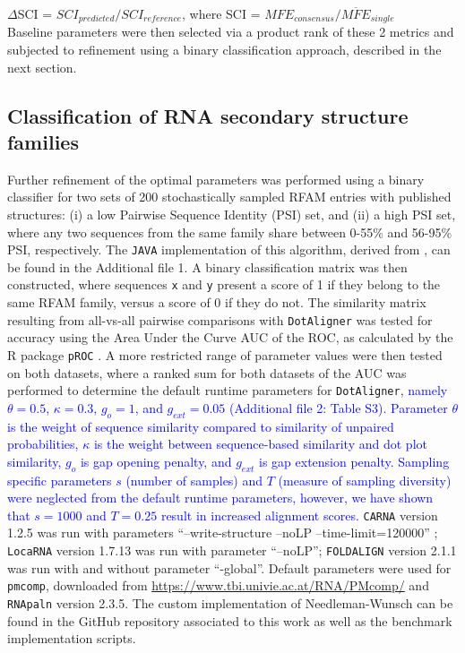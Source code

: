 \documentclass{bmcart}
\newcommand\dotaligner{\texttt{DotAligner}}
\newcommand\locarna{\texttt{LocaRNA}}
\newcommand\foldalign{\texttt{FOLDALIGN}}
\newcommand\carna{\texttt{CARNA}}
\begin{document}
$\Delta$SCI = $SCI_{predicted} / SCI_{reference}$, where SCI = $ MFE_{consensus}  / \overline{MFE}_{single}  $\\

Baseline parameters were then selected via a product rank of these 2 metrics 
and subjected to refinement using a binary classification approach, described in the next section. 

\subsection*{Classification of RNA secondary structure families}
Further refinement of the optimal parameters was performed using a binary classifier for two sets of 
200 stochastically sampled RFAM entries with published structures: 
(i) a low Pairwise Sequence Identity (PSI) set, and (ii) a high PSI set, 
where any two sequences from the same family share between 0-55\% and 56-95\% PSI, respectively. The \texttt{JAVA} implementation of this algorithm, derived from \cite{smith2013widespread}, can be found in the Additional file 1. 
A binary classification matrix was then constructed, where sequences \texttt{x} and \texttt{y}
present a score of 1 if they belong to the same RFAM family, versus a score of 0 if they do not. 
The similarity matrix resulting from all-vs-all pairwise comparisons with \dotaligner{} was tested for 
accuracy using the Area Under the Curve AUC of the ROC, as calculated by the R package \texttt{pROC} \cite{robin2011proc}. 
A more restricted range of parameter values were then tested on both datasets, where a ranked sum for both datasets of the AUC was performed to determine the default runtime parameters for \dotaligner, 
\textcolor{blue}{
namely $\theta=0.5$, $\kappa=0.3$, $g_o=1$, and $g_{ext}=0.05$ (Additional file 2: Table S3). Parameter $\theta$ is the weight of sequence similarity compared to similarity of unpaired probabilities, $\kappa$ is the weight between sequence-based similarity and dot plot similarity, $g_o$ is gap opening penalty, and $g_{ext}$ is gap extension penalty.
Sampling specific parameters $s$ (number of samples) and $T$ (measure of sampling diversity) were neglected from the default runtime parameters, however, we have shown that $s=1000$ and $T=0.25$ result in increased alignment scores.}
\carna{} version 1.2.5 was run with parameters ``--write-structure --noLP --time-limit=120000'' ;  \locarna{} version 1.7.13 was run with parameter ``--noLP''; \foldalign{} version 2.1.1 was run with and without parameter ``-global''. Default parameters were used for \texttt{pmcomp}, downloaded from \url{https://www.tbi.univie.ac.at/RNA/PMcomp/} and \texttt{RNApaln} version 2.3.5. The custom implementation of Needleman-Wunsch can be found in the GitHub repository associated to this work as well as the benchmark implementation scripts. \\
\end{document}
